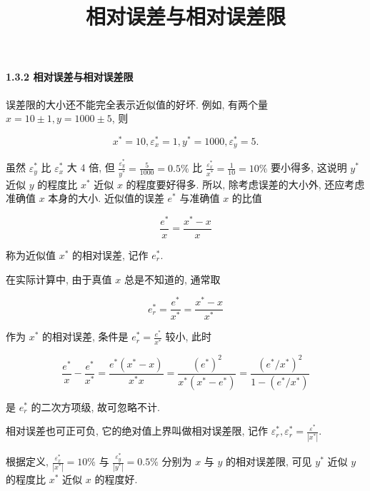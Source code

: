\documentclass[
  10pt,
  fontset=fandol]{ctexart}
\title{相对误差与相对误差限}
\author{}
\date{}
\begin{document}
\maketitle

\paragraph{1.3.2 相对误差与相对误差限}\label{ux76f8ux5bf9ux8befux5deeux4e0eux76f8ux5bf9ux8befux5deeux9650}

误差限的大小还不能完全表示近似值的好坏. 例如, 有两个量 \(x = 10 \pm 1, y = 1000 \pm 5\), 则

\[
x^* = 10, \varepsilon_x^* = 1, y^* = 1000, \varepsilon_y^* = 5.
\]

虽然 \(\varepsilon_y^*\) 比 \(\varepsilon_x^*\) 大 4 倍, 但 \(\frac{\varepsilon_y^*}{y^*} = \frac{5}{1000} = 0.5\%\) 比 \(\frac{\varepsilon_x^*}{x^*} = \frac{1}{10} = 10\%\) 要小得多, 这说明 \(y^*\) 近似 \(y\) 的程度比 \(x^*\) 近似 \(x\) 的程度要好得多. 所以, 除考虑误差的大小外, 还应考虑准确值 \(x\) 本身的大小. 近似值的误差 \(e^*\) 与准确值 \(x\) 的比值

\[
\frac{e^*}{x} = \frac{x^* - x}{x}
\]

称为近似值 \(x^*\) 的相对误差, 记作 \(e_r^*\).

在实际计算中, 由于真值 \(x\) 总是不知道的, 通常取

\[
e_r^* = \frac{e^*}{x^*} = \frac{x^* - x}{x^*}
\]

作为 \(x^*\) 的相对误差, 条件是 \(e_r^* = \frac{e^*}{x^*}\) 较小, 此时

\[
\frac{e^*}{x} - \frac{e^*}{x^*} = \frac{e^* (x^* - x)}{x^* x} = \frac{(e^*)^2}{x^* (x^* - e^*)} = \frac{(e^* / x^*)^2}{1 - (e^* / x^*)}
\]

是 \(e_r^*\) 的二次方项级, 故可忽略不计.

相对误差也可正可负, 它的绝对值上界叫做相对误差限, 记作 \(\varepsilon_r^*, \varepsilon_r^* = \frac{\varepsilon^*}{|x^*|}\).

根据定义, \(\frac{\varepsilon_x^*}{|x^*|} = 10\%\) 与 \(\frac{\varepsilon_y^*}{|y^*|} = 0.5\%\) 分别为 \(x\) 与 \(y\) 的相对误差限, 可见 \(y^*\) 近似 \(y\) 的程度比 \(x^*\) 近似 \(x\) 的程度好.
\end{document}
